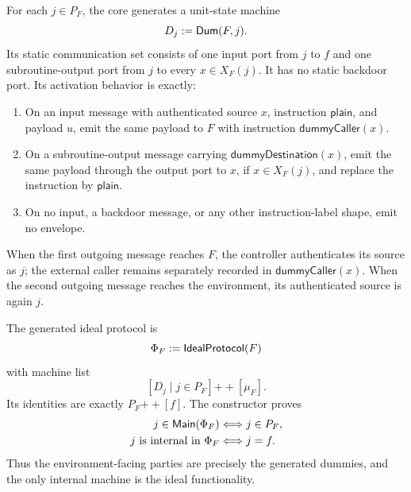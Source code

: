 \begin{definition}
\label{def:uc-dummy-party}
\leanok
For each \(j\in P_F\), the core generates a unit-state machine
\[
  D_j:=\mathsf{Dum}(F,j).
\]
Its static communication set consists of one input port from \(j\) to \(f\)
and one subroutine-output port from \(j\) to every \(x\in X_F(j)\).  It has no
static backdoor port.  Its activation behavior is exactly:
\begin{enumerate}
\item On an input message with authenticated source \(x\), instruction
      \(\mathsf{plain}\), and payload \(u\), emit the same payload to \(F\) with
      instruction \(\mathsf{dummyCaller}(x)\).
\item On a subroutine-output message carrying
      \(\mathsf{dummyDestination}(x)\), emit the same payload through the output
      port to \(x\), if \(x\in X_F(j)\), and replace the instruction by
      \(\mathsf{plain}\).
\item On no input, a backdoor message, or any other instruction-label shape,
      emit no envelope.
\end{enumerate}
When the first outgoing message reaches \(F\), the controller authenticates its
source as \(j\); the external caller remains separately recorded in
\(\mathsf{dummyCaller}(x)\).  When the second outgoing message reaches the
environment, its authenticated source is again \(j\).
\end{definition}

\begin{definition}
\label{def:uc-ideal-protocol}
\leanok
The generated ideal protocol is
\[
  \Phi_F:=\mathsf{IdealProtocol}(F)
\]
with machine list
\[
  [D_j\mid j\in P_F]\mathbin{++}[\mu_F].
\]
Its identities are exactly \(P_F\mathbin{++}[f]\).  The constructor proves
\[
\begin{aligned}
  j\in\mathsf{Main}(\Phi_F)&\Longleftrightarrow j\in P_F,\\
  j\text{ is internal in }\Phi_F&\Longleftrightarrow j=f.
\end{aligned}
\]
Thus the environment-facing parties are precisely the generated dummies, and
the only internal machine is the ideal functionality.
\end{definition}

